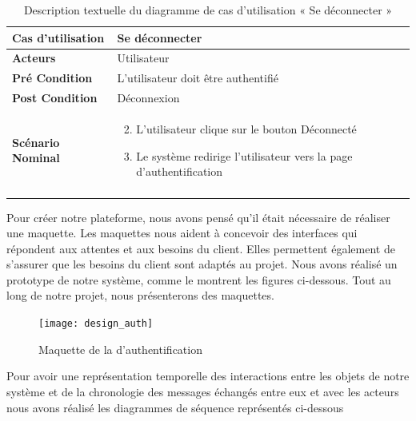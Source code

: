\begin{longtable}{|p{5cm}|p{10cm}|}
\hline
\textbf{Cas d'utilisation}&Se déconnecter\\
\hline
\textbf{Acteurs}&Utilisateur \\
\hline
\textbf{Pré Condition}&L'utilisateur doit être authentifié\\
\hline
\textbf{Post Condition}&Déconnexion\\
\hline
\textbf{Scénario Nominal}&
\vspace{-\baselineskip}
\begin{enumerate}
    \setcounter{enumi}{1}
    \item L'utilisateur clique sur le bouton Déconnecté
    \item Le système redirige l'utilisateur vers la page d'authentification

\end{enumerate}\\
\hline
\caption{Description textuelle du diagramme de cas d'utilisation « Se déconnecter »}
\label{tab:use_case_logout}
\end{longtable}

Pour créer notre plateforme, nous avons pensé qu'il était nécessaire de réaliser une maquette. Les maquettes nous aident à concevoir des interfaces qui répondent aux attentes et aux besoins du client. Elles permettent également de s'assurer que les besoins du client sont adaptés au projet. Nous avons réalisé un prototype de notre système, comme le montrent les figures ci-dessous. Tout au long de notre projet, nous présenterons des maquettes.

\begin{figure}[H]
  \centering
  \texttt{[image: design\_auth]}
  \caption{Maquette de la d'authentification}
  \label{fig:design_auth}
\end{figure}


Pour avoir une représentation temporelle des interactions entre les objets de notre système et de la chronologie des messages échangés entre eux et avec les acteurs nous avons réalisé les diagrammes de séquence représentés ci-dessous

